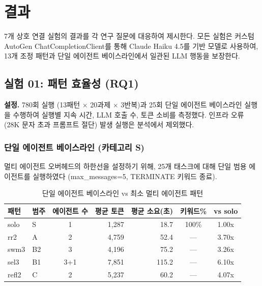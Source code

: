 
\section{결과}
\label{sec:results}

7개 상호 연결 실험의 결과를 각 연구 질문에 대응하여 제시한다. 모든 실험은 커스텀 AutoGen ChatCompletionClient를 통해 Claude Haiku 4.5를 기반 모델로 사용하여, 13개 조정 패턴과 단일 에이전트 베이스라인에서 일관된 LLM 행동을 보장한다.

\subsection{실험 01: 패턴 효율성 (RQ1)}

\textbf{설정.} 780회 실행 (13패턴 $\times$ 20과제 $\times$ 3반복)과 25회 단일 에이전트 베이스라인 실행을 수행하여 실행별 지속 시간, LLM 호출 수, 토큰 소비를 측정했다. 인프라 오류 (28K 문자 초과 프롬프트 절단) 발생 실행은 분석에서 제외했다.

\subsubsection{단일 에이전트 베이스라인 (카테고리 S)}

멀티 에이전트 오버헤드의 하한선을 설정하기 위해, 25개 태스크에 대해 단일 범용 에이전트를 실행하였다 (max\_messages=5, TERMINATE 키워드 종료).

\begin{table}[H]
\centering
\caption{단일 에이전트 베이스라인 vs 최소 멀티 에이전트 패턴}
\label{tab:solo-baseline}
{\small
\begin{tabular}{llcrrcc}
\toprule
패턴 & 범주 & 에이전트 수 & 평균 토큰 & 평균 소요(초) & 키워드\% & vs solo \\
\midrule
solo & S & 1 & 1,287 & 18.7 & 100\% & 1.00x \\
rr2  & A & 2 & 4,759 & 52.4 & --- & 3.70x \\
swm3 & B2 & 3 & 4,196 & 75.2 & --- & 3.26x \\
sel3 & B1 & 3+1 & 7,851 & 115.2 & --- & 6.10x \\
refl2 & C & 2 & 5,237 & 60.2 & --- & 4.07x \\
\bottomrule
\end{tabular}
}
\end{table}

